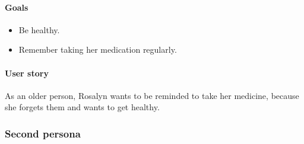 \documentclass[conference]{IEEEtran}
\begin{document}
\paragraph*{Goals}
\begin{itemize}[leftmargin=1.25cm]
	\item Be healthy.
	\item Remember taking her medication regularly.
\end{itemize}

\paragraph*{User story}
As an older person, Rosalyn wants to be reminded to take her medicine, because she forgets them and wants to get healthy.

\subsubsection{Second persona} \hfill
\end{document}
